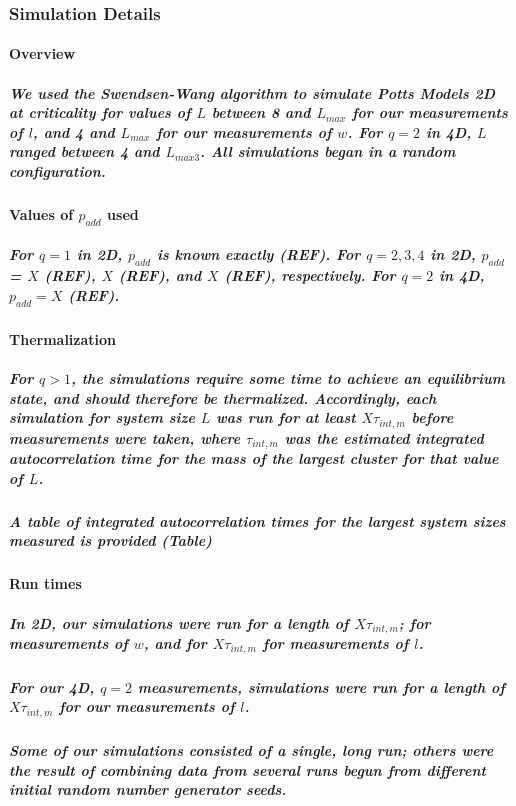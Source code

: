 \documentclass[pre,preprint]{revtex4-1}
\begin{document}
\subsubsection{Simulation Details}
\label{sec-1.2.5}
\paragraph{Overview}
\label{sec-1.2.5.1}
\subparagraph{We used the Swendsen-Wang algorithm to simulate Potts Models 2D at criticality for values of $L$ between 8 and $L_{max}$ for our  measurements of $l$, and 4 and $L_{max}$ for our measurements of $w$.  For $q=2$ in 4D, $L$ ranged between 4 and $L_{max3}$.  All simulations began in a random configuration.}
\label{sec-1.2.5.1.1}
\paragraph{Values of $p_{add}$ used}
\label{sec-1.2.5.2}
\subparagraph{For $q=1$ in 2D, $p_{add}$ is known exactly (REF).  For $q=2,3,4$ in 2D, $p_{add}$ = $X$ (REF), $X$ (REF), and $X$ (REF), respectively. For $q=2$ in 4D, $p_{add}=X$ (REF).}
\label{sec-1.2.5.2.1}
\paragraph{Thermalization}
\label{sec-1.2.5.3}
\subparagraph{For $q>1$, the simulations require some time to achieve an equilibrium state, and should therefore be thermalized. Accordingly, each simulation for system size $L$ was run for at least $X \tau_{int,m}$ before measurements were taken, where $\tau_{int,m}$ was the estimated integrated autocorrelation time for the mass of the largest cluster for that value of $L$.}
\label{sec-1.2.5.3.1}
\subparagraph{A table of integrated autocorrelation times for the largest system sizes measured is provided (Table)}
\label{sec-1.2.5.3.2}
\paragraph{Run times}
\label{sec-1.2.5.4}
\subparagraph{In 2D, our simulations were run for a length of $X \tau_{int,m}$; for measurements of $w$, and for $X  \tau_{int,m}$ for measurements of $l$.}
\label{sec-1.2.5.4.1}
\subparagraph{For our 4D, $q=2$ measurements, simulations were run for a length of $X \tau_{int,m}$ for our measurements of $l$.}
\label{sec-1.2.5.4.2}
\subparagraph{Some of our simulations consisted of a single, long run; others were the result of combining data from several runs begun from different initial random number generator seeds.}
\label{sec-1.2.5.4.3}
\end{document}
